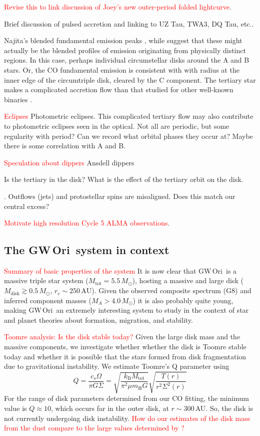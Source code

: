 \documentclass[twocolumn]{aastex61}
\newcommand{\todo}[1]{ \textcolor{red}{#1}}
\newcommand{\gw}{GW\,Ori}
\begin{document}
\todo{Revise this to link discussion of Joey's new outer-period folded lightcurve}.

Brief discussion of pulsed accretion and linking to UZ Tau, TWA3, DQ Tau, etc..

Najita's blended fundamental emission peaks \citep{najita03}, while \citet{bast11} suggest that these might actually be the blended profiles of emission originating from physically distinct regions. In this case, perhaps individual circumstellar disks around the A and B stars. Or, the CO fundamental emission is consistent with with radius at the inner edge of the circumtriple disk, cleared by the C component. The tertiary star makes a complicated accretion flow than that studied for other well-known binaries \citep[e.g., DQ~Tau;]{artymowicz94,mathieu97}.

\todo{Eclipses}
Photometric eclipses. This complicated tertiary flow may also contribute to photometric eclipses seen in the optical. Not all are periodic, but some regularity with period? Can we record what orbital phases they occur at? Maybe there is some correlation with A and B.

\todo{Speculation about dippers}
Ansdell dippers

Is the tertiary in the disk? What is the effect of the tertiary orbit on the disk.

\citep{offner16}. Outflows (jets) and protostellar spins are misaligned. Does this match our central excess?

\todo{Motivate high resolution Cycle 5 ALMA observations}.


\subsection{The \gw\ system in context}

\todo{Summary of basic properties of the system}
It is now clear that \gw\ is a massive triple star system ($M_\mathrm{tot} = 5.5\,M_\odot$), hosting a massive and large disk ($M_\mathrm{disk} \gtrsim 0.5\,M_\odot$, $r_c \sim 250\,\mathrm{AU}$). Given the observed composite spectrum (G8) and inferred component masses ($M_A > 4.0\,M_\odot$) it is also probably quite young, making \gw\ an extremely interesting system to study in the context of star and planet theories about formation, migration, and stability.

\todo{Toomre analysis: Is the disk stable today?}
Given the large disk mass and the massive components, we investigate whether whether the disk is Toomre stable today and whether it is possible that the stars formed from disk fragmentation due to gravitational instability. We estimate Toomre's Q parameter using
\begin{equation}
Q = \frac{c_s \Omega}{\pi G \Sigma} = \sqrt{\frac{k_\mathrm{B} M_\mathrm{tot}}{\pi^2 \mu m_\mathrm{H} G}} \sqrt{\frac{T(r)}{r^2 \Sigma^2(r)}}
\end{equation}
For the range of disk parameters determined from our CO fitting, the minimum value is $Q \approx 10$, which occurs far in the outer disk, at $r \sim 300\,$AU. So, the disk is not currently undergoing disk instability. \todo{How do our estimates of the disk mass from the dust compare to the large values determined by \citet{mathieu91,mathieu95}?}
\end{document}
